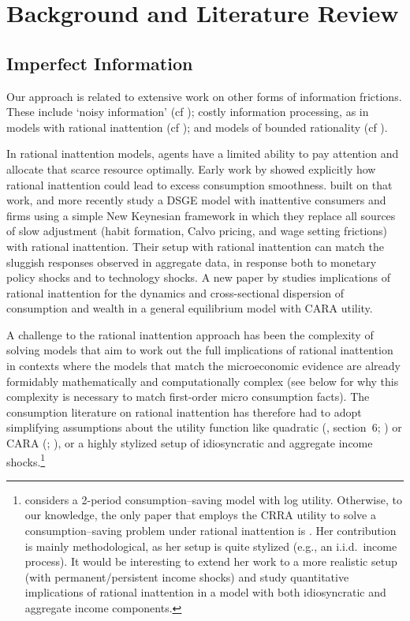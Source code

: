 \documentclass[titlepage]{./econtex}
\begin{document}
\section{Background and Literature Review}\label{sec:relation}

\subsection{Imperfect Information}
Our approach is related to extensive work on other forms of information frictions. These include `noisy information' (cf \cite{pischkeMicroMacro}); costly information processing, as in models with rational inattention (cf \cite{simsInattention}); and models of bounded rationality (cf \cite{gabaixSparsityQJE}).

In rational inattention models, agents have a limited ability to pay attention and allocate that scarce resource optimally. Early work by \cite{reis:inattentive} showed explicitly how rational inattention could lead to excess consumption smoothness.
\cite{mw09:RI} built on that work, and more recently \cite{mackWiedREStud15} study a DSGE model with inattentive consumers and firms using a simple New Keynesian framework in which they replace all sources of slow adjustment (habit formation, Calvo pricing, and wage setting frictions) with rational inattention. Their setup with rational inattention can match the sluggish responses observed in aggregate data, in response both to monetary policy shocks and to technology shocks. A new paper by \cite{LuoRinGE} studies implications of rational inattention for the dynamics and cross-sectional dispersion of consumption and wealth in a general equilibrium model with CARA utility.

A challenge to the rational inattention approach has been the complexity of solving models that aim to work out the full implications of rational inattention in contexts where the models that match the microeconomic evidence are already formidably mathematically and computationally complex (see below for why this complexity is necessary to match first-order micro consumption facts).  The consumption literature on rational inattention has therefore had to adopt simplifying assumptions about the utility function like quadratic (\cite{simsInattention}, section~6; \cite{luo:inatC}) or CARA (\cite{LuoRinGE}; \cite{reis:inattentive}), or a highly stylized setup of idiosyncratic and aggregate income shocks.\footnote{\cite{sims_beyondLQ} considers a 2-period consumption--saving model with log utility. Otherwise, to our knowledge, the only paper that employs the CRRA utility to solve a consumption--saving problem under rational inattention is \cite{tutino_RIconsumption}. Her contribution is mainly methodological, as her setup is quite stylized (e.g., an i.i.d.\ income process).  It would be interesting to extend her work to a more realistic setup (with permanent/persistent income shocks) and study quantitative implications of rational inattention in a model with both idiosyncratic and aggregate income components.}
\end{document}
